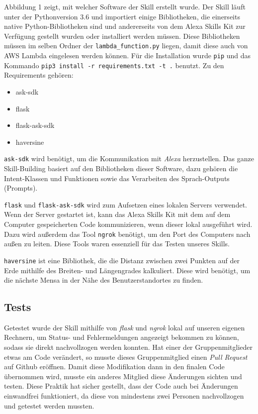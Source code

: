 \documentclass[12pt]{article}
\begin{document}
Abbildung 1 zeigt, mit welcher Software der Skill erstellt wurde.
Der Skill läuft unter der Pythonversion 3.6 und importiert einige Bibliotheken, die einerseits native Python-Bibliotheken sind und andererseits von dem Alexa Skills Kit zur Verfügung gestellt wurden oder installiert werden müssen.
Diese Bibliotheken müssen im selben Ordner der \texttt{lambda\_function.py} liegen, damit diese auch von AWS Lambda eingelesen werden können.
Für die Installation wurde \texttt{pip} und das Kommando \texttt{pip3 install -r requirements.txt -t .} benutzt.
Zu den Requirements gehören:
\begin{itemize}
  \setlength\itemsep{0em}
  \item ask-sdk
  \item flask
  \item flask-ask-sdk
  \item haversine
\end{itemize}

\texttt{ask-sdk} wird benötigt, um die Kommunikation mit \emph{Alexa} herzustellen.
Das ganze Skill-Building basiert auf den Bibliotheken dieser Software, dazu gehören die Intent-Klassen und Funktionen sowie das Verarbeiten des Sprach-Outputs (Prompts). 

\texttt{flask} und \texttt{flask-ask-sdk} wird zum Aufsetzen eines lokalen Servers verwendet.
Wenn der Server gestartet ist, kann das Alexa Skills Kit mit dem auf dem Computer gespeicherten Code kommunizieren, wenn dieser lokal ausgeführt wird.
Dazu wird außerdem das Tool \texttt{ngrok} benötigt, um den Port des Computers nach außen zu leiten.
Diese Tools waren essenziell für das Testen unseres Skills. 

\texttt{haversine} ist eine Bibliothek, die die Distanz zwischen zwei Punkten auf der Erde mithilfe des Breiten- und Längengrades kalkuliert.
Diese wird benötigt, um die nächste Mensa in der Nähe des Benutzerstandortes zu finden.

\subsection{Tests}
Getestet wurde der Skill mithilfe von \emph{flask} und \emph{ngrok} lokal auf unseren eigenen Rechnern, um Status- und Fehlermeldungen angezeigt bekommen zu können, sodass sie direkt nachvollzogen werden konnten. 
Hat einer der Gruppenmitglieder etwas am Code verändert, so musste dieses Gruppenmitglied einen \emph{Pull Request} auf Github eröffnen.
Damit diese Modifikation dann in den finalen Code übernommen wird, musste ein anderes Mitglied diese Änderungen sichten und testen.
Diese Praktik hat sicher gestellt, dass der Code auch bei Änderungen einwandfrei funktioniert, da diese von mindestens zwei Personen nachvollzogen und getestet werden mussten.
\end{document}
